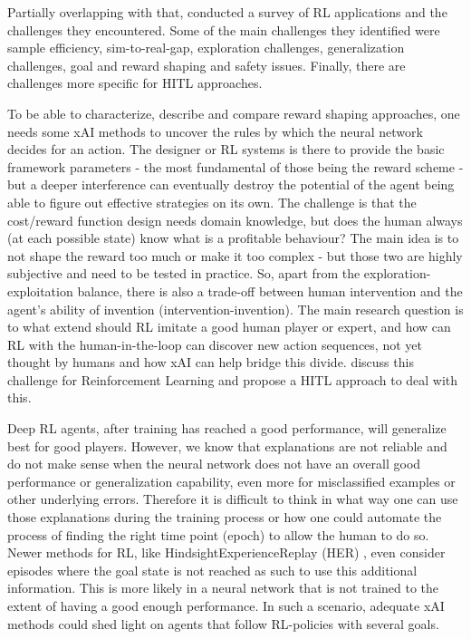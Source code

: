 \documentclass[twoside,11pt]{article}
\begin{document}
Partially overlapping with that, \cite{ibarz2021train} conducted a survey of RL applications and the challenges they encountered. Some of the main challenges they identified were sample efficiency, sim-to-real-gap, exploration challenges, generalization challenges, goal and reward shaping and safety issues. Finally, there are challenges more specific for HITL approaches. 

To be able to characterize, describe and compare reward shaping approaches, one needs some xAI methods to uncover the rules by which the neural network decides for an action. The designer or RL systems is there to provide the basic framework parameters - the most fundamental of those being the reward scheme - but a deeper interference can eventually destroy the potential of the agent being able to figure out effective strategies on its own. The challenge is that the cost/reward function design needs domain knowledge, but does the human always (at each possible state) know what is a profitable behaviour? The main idea is to not shape the reward too much or make it too complex - but those two are highly subjective and need to be tested in practice. So, apart from the exploration-exploitation balance, there is also a trade-off between human intervention and the agent's ability of invention (intervention-invention). The main research question is to what extend should RL imitate a good human player or expert, and how can RL with the human-in-the-loop can discover new action sequences, not yet thought by humans and how xAI can help bridge this divide. \cite{LeeSmithAbbeel:2021:FeedbackPreferenceHITLLearningPEBBLE} discuss this challenge for Reinforcement Learning and propose a HITL approach to deal with this.

Deep RL agents, after training has reached a good performance, will generalize best for good players. However, we know that explanations are not reliable and do not make sense when the neural network does not have an overall good performance or generalization capability, even more for misclassified examples or other underlying errors. Therefore it is difficult to think in what way one can use those explanations during the training process or how one could automate the process of finding the right time point (epoch) to allow the human to do so. Newer methods for RL, like HindsightExperienceReplay (HER) \cite{Andrychowicz:2017:HERHindsightExperienceReplay}, even consider episodes where the goal state is not reached as such to use this additional information. This is more likely in a neural network that is not trained to the extent of having a good enough performance. In such a scenario, adequate xAI methods could shed light on agents that follow RL-policies with several goals. 
\end{document}
